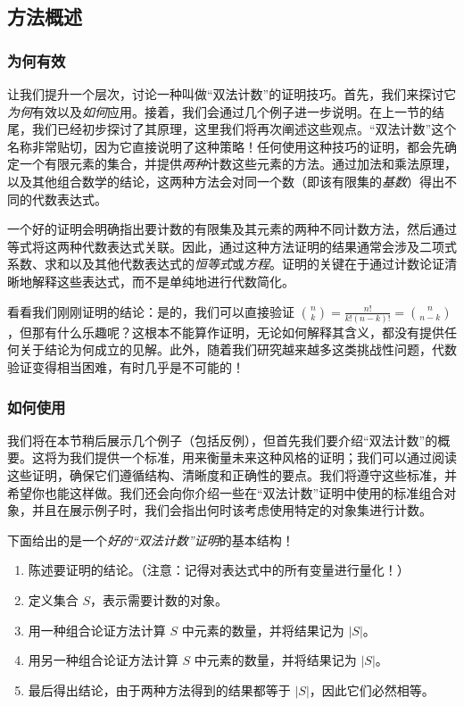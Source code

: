 
\subsection{方法概述}

\subsubsection*{为何有效}

让我们提升一个层次，讨论一种叫做``双法计数''的证明技巧。首先，我们来探讨它\emph{为何}有效以及\emph{如何}应用。接着，我们会通过几个例子进一步说明。在上一节的结尾，我们已经初步探讨了其原理，这里我们将再次阐述这些观点。``双法计数''这个名称非常贴切，因为它直接说明了这种策略！任何使用这种技巧的证明，都会先确定一个有限元素的集合，并提供\emph{两种}计数这些元素的方法。通过加法和乘法原理，以及其他组合数学的结论，这两种方法会对同一个数（即该有限集的\emph{基数}）得出不同的代数表达式。

一个好的证明会明确指出要计数的有限集及其元素的两种不同计数方法，然后通过等式将这两种代数表达式关联。因此，通过这种方法证明的结果通常会涉及二项式系数、求和以及其他代数表达式的\emph{恒等式}或\emph{方程}。证明的关键在于通过计数论证清晰地解释这些表达式，而不是单纯地进行代数简化。

看看我们刚刚证明的结论：是的，我们可以直接验证 ${n \choose k}= \frac{n!}{k!(n-k)!} = {n \choose n-k}$，但那有什么乐趣呢？这根本不能算作证明，无论如何解释其含义，都没有提供任何关于结论为何成立的见解。此外，随着我们研究越来越多这类挑战性问题，代数验证变得相当困难，有时几乎是不可能的！

\subsubsection*{如何使用}

我们将在本节稍后展示几个例子（包括反例），但首先我们要介绍``双法计数''的概要。这将为我们提供一个标准，用来衡量未来这种风格的证明；我们可以通过阅读这些证明，确保它们遵循结构、清晰度和正确性的要点。我们将遵守这些标准，并希望你也能这样做。我们还会向你介绍一些在``双法计数''证明中使用的标准组合对象，并且在展示例子时，我们会指出何时该考虑使用特定的对象集进行计数。

下面给出的是一个\emph{好的``双法计数''证明}的基本结构！

\begin{enumerate}
    \item 陈述要证明的结论。（注意：记得对表达式中的所有变量进行量化！）
    \item 定义集合 $S$，表示需要计数的对象。
    \item 用一种组合论证方法计算 $S$ 中元素的数量，并将结果记为 $|S|$。
    \item 用另一种组合论证方法计算 $S$ 中元素的数量，并将结果记为 $|S|$。
    \item 最后得出结论，由于两种方法得到的结果都等于 $|S|$，因此它们必然相等。
\end{enumerate}

